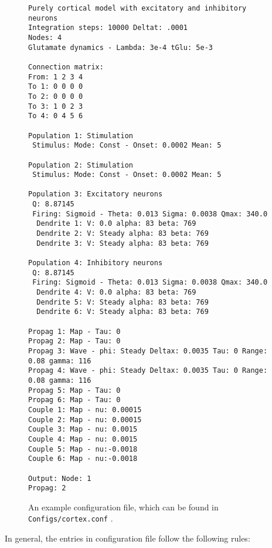 \documentclass[12pt,a4paper]{article}
\newcommand{\type}[1]{ {\small\small\tt #1} }
\begin{document}
\begin{figure}\begin{center}
	\begin{lstlisting}
Purely cortical model with excitatory and inhibitory neurons
Integration steps: 10000 Deltat: .0001 
Nodes: 4
Glutamate dynamics - Lambda: 3e-4 tGlu: 5e-3

Connection matrix:
From: 1 2 3 4
To 1: 0 0 0 0
To 2: 0 0 0 0
To 3: 1 0 2 3
To 4: 0 4 5 6

Population 1: Stimulation
 Stimulus: Mode: Const - Onset: 0.0002 Mean: 5

Population 2: Stimulation
 Stimulus: Mode: Const - Onset: 0.0002 Mean: 5

Population 3: Excitatory neurons
 Q: 8.87145
 Firing: Sigmoid - Theta: 0.013 Sigma: 0.0038 Qmax: 340.0
  Dendrite 1: V: 0.0 alpha: 83 beta: 769
  Dendrite 2: V: Steady alpha: 83 beta: 769
  Dendrite 3: V: Steady alpha: 83 beta: 769

Population 4: Inhibitory neurons
 Q: 8.87145
 Firing: Sigmoid - Theta: 0.013 Sigma: 0.0038 Qmax: 340.0
  Dendrite 4: V: 0.0 alpha: 83 beta: 769
  Dendrite 5: V: Steady alpha: 83 beta: 769
  Dendrite 6: V: Steady alpha: 83 beta: 769

Propag 1: Map - Tau: 0
Propag 2: Map - Tau: 0
Propag 3: Wave - phi: Steady Deltax: 0.0035 Tau: 0 Range: 0.08 gamma: 116
Propag 4: Wave - phi: Steady Deltax: 0.0035 Tau: 0 Range: 0.08 gamma: 116
Propag 5: Map - Tau: 0
Propag 6: Map - Tau: 0
Couple 1: Map - nu: 0.00015
Couple 2: Map - nu: 0.00015
Couple 3: Map - nu: 0.0015
Couple 4: Map - nu: 0.0015
Couple 5: Map - nu:-0.0018
Couple 6: Map - nu:-0.0018

Output: Node: 1
Propag: 2
	\end{lstlisting}
\end{center}
\caption{An example configuration file, which can be found in \type{Configs/cortex.conf}.}
\end{figure}

In general, the entries in configuration file follow the following rules:
\end{document}
